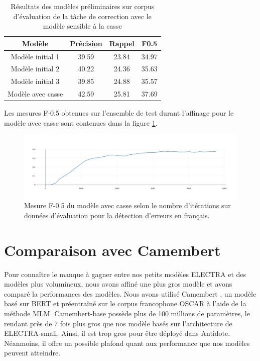 \documentclass[12pt,twoside,maitrise]{dms}
\theoremstyle{definition}
\numberwithin{equation}{section}
\numberwithin{table}{chapter}
\numberwithin{figure}{chapter}
\begin{document}
\begin{table}
	\centering
	\begin{tabular}{||c | c | c | c||}
		\hline
		Modèle            & Précision & Rappel & F0.5  \\ [0.5ex]
		\hline\hline
		Modèle initial 1  & 39.59     & 23.84  & 34.97 \\
		Modèle initial 2  & 40.22     & 24.36  & 35.63 \\
		Modèle initial 3  & 39.85     & 24.88  & 35.57 \\
		Modèle avec casse & 42.59     & 25.81  & 37.69 \\
		\hline
	\end{tabular}
	\caption{Résultats des modèles préliminaires sur corpus d'évaluation de la tâche de correction avec le modèle sensible à la casse}
	\label{table:resaffinagecasse}
\end{table}

Les mesures F-0.5 obtenues sur l'ensemble de test durant
l'affinage pour le modèle avec casse sont contenues dans la figure
\ref{fig:f05electraaveccasse}.
\begin{figure}
	\begin{center}
		\includegraphics[width=1.0\textwidth]{figures/electraaveccassef05.png}
	\end{center}
	\caption{Mesure F-0.5 du modèle avec casse selon le nombre d'itérations sur
		données d'évaluation pour la détection d'erreurs en
		français.}\label{fig:f05electraaveccasse}
\end{figure}

\section{Comparaison avec Camembert}
Pour connaître le manque à gagner entre nos petits modèles ELECTRA et des
modèles plus volumineux, nous avons affiné une plus gros modèle et avons
comparé la performances des modèles. Nous avons utilisé Camembert
\cite{camembert}, un modèle basé sur BERT et préentraîné sur le corpus
francophone OSCAR \cite{oscar} à l'aide de la méthode MLM. Camembert-base
possède plus de 100 millions de paramètres, le rendant près de 7 fois plus gros
que nos modèle basés sur l'architecture de ELECTRA-small. Ainsi, il est trop
gros pour être déployé dans Antidote. Néanmoins, il offre un possible plafond
quant aux performance que nos modèles peuvent atteindre. \\
\end{document}
